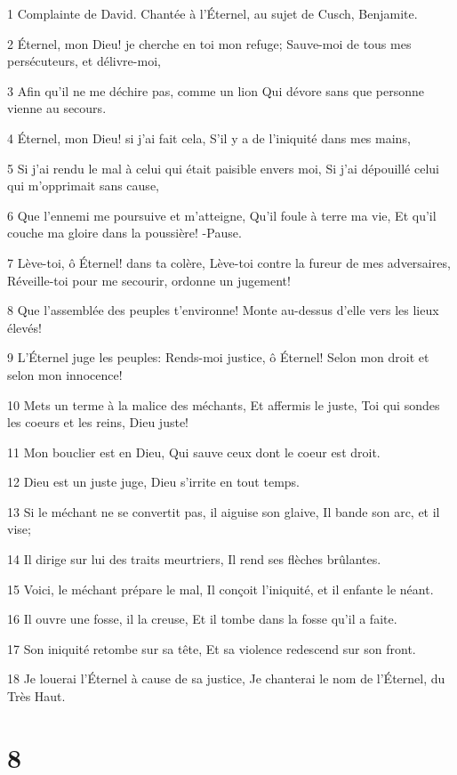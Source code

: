 \par 1 Complainte de David. Chantée à l'Éternel, au sujet de Cusch, Benjamite.
\par 2 Éternel, mon Dieu! je cherche en toi mon refuge; Sauve-moi de tous mes persécuteurs, et délivre-moi,
\par 3 Afin qu'il ne me déchire pas, comme un lion Qui dévore sans que personne vienne au secours.
\par 4 Éternel, mon Dieu! si j'ai fait cela, S'il y a de l'iniquité dans mes mains,
\par 5 Si j'ai rendu le mal à celui qui était paisible envers moi, Si j'ai dépouillé celui qui m'opprimait sans cause,
\par 6 Que l'ennemi me poursuive et m'atteigne, Qu'il foule à terre ma vie, Et qu'il couche ma gloire dans la poussière! -Pause.
\par 7 Lève-toi, ô Éternel! dans ta colère, Lève-toi contre la fureur de mes adversaires, Réveille-toi pour me secourir, ordonne un jugement!
\par 8 Que l'assemblée des peuples t'environne! Monte au-dessus d'elle vers les lieux élevés!
\par 9 L'Éternel juge les peuples: Rends-moi justice, ô Éternel! Selon mon droit et selon mon innocence!
\par 10 Mets un terme à la malice des méchants, Et affermis le juste, Toi qui sondes les coeurs et les reins, Dieu juste!
\par 11 Mon bouclier est en Dieu, Qui sauve ceux dont le coeur est droit.
\par 12 Dieu est un juste juge, Dieu s'irrite en tout temps.
\par 13 Si le méchant ne se convertit pas, il aiguise son glaive, Il bande son arc, et il vise;
\par 14 Il dirige sur lui des traits meurtriers, Il rend ses flèches brûlantes.
\par 15 Voici, le méchant prépare le mal, Il conçoit l'iniquité, et il enfante le néant.
\par 16 Il ouvre une fosse, il la creuse, Et il tombe dans la fosse qu'il a faite.
\par 17 Son iniquité retombe sur sa tête, Et sa violence redescend sur son front.
\par 18 Je louerai l'Éternel à cause de sa justice, Je chanterai le nom de l'Éternel, du Très Haut.

\chapter{8}

